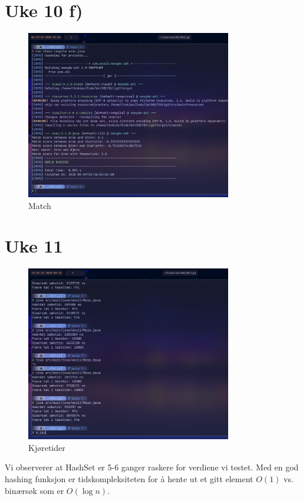 \documentclass[12pt]{article}
\begin{document}
\section*{Uke 10 f)} 
\begin{figure}[h]
    \centering
    \includegraphics[width=0.8\textwidth]{./Match.png} 
    \caption{Match}
    \label{fig:match}
\end{figure}

\break
\section*{Uke 11} 
\begin{figure}[h]
    \centering 
    \includegraphics[width=0.8\textwidth]{./HashSetBinaryRuntime.png}
    \caption{Kjøretider}
    \label{fig:hashbinaryruntimes}
\end{figure}

\noindent
Vi observerer at HashSet er 5-6 ganger raskere for verdiene vi testet. 
Med en god hashing funksjon er tidskompleksiteten for å hente ut et gitt element 
\(O(1)\) vs. binærsøk som er \(O(\log n)\).
\end{document}
